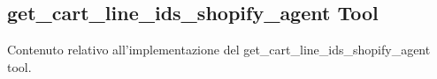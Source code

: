 \subsection{get\_cart\_line\_ids\_shopify\_agent Tool}

Contenuto relativo all'implementazione del get\_cart\_line\_ids\_shopify\_agent tool.
